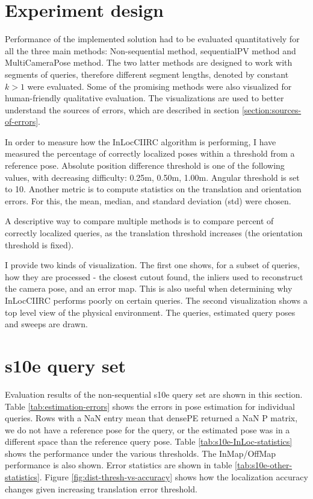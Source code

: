 \documentclass[twoside]{ctuthesis}
\theoremstyle{plain}
\theoremstyle{definition}
\theoremstyle{note}
\begin{document}
\section{Experiment design}
Performance of the implemented solution had to be evaluated quantitatively for all the three main methods: Non-sequential method, sequentialPV method and MultiCameraPose method. The two latter methods are designed to work with segments of queries, therefore different segment lengths, denoted by constant $k>1$ were evaluated. Some of the promising methods were also visualized for human-friendly qualitative evaluation. The visualizations are used to better understand the sources of errors, which are described in section \ref{section:sources-of-errors}.

In order to measure how the InLocCIIRC algorithm is performing, I have measured the percentage of correctly localized poses within a threshold from a reference pose. Absolute position difference threshold is one of the following values, with decreasing difficulty: 0.25m, 0.50m, 1.00m. Angular threshold is set to 10\degree. Another metric is to compute statistics on the translation and orientation errors. For this, the mean, median, and standard deviation (std) were chosen.

A descriptive way to compare multiple methods is to compare percent of correctly localized queries, as the translation threshold increases (the orientation threshold is fixed).

I provide two kinds of visualization. The first one shows, for a subset of queries, how they are processed - the closest cutout found, the inliers used to reconstruct the camera pose, and an error map. This is also useful when determining why InLocCIIRC performs poorly on certain queries. The second visualization shows a top level view of the physical environment. The queries, estimated query poses and sweeps are drawn.

\section{s10e query set}
Evaluation results of the non-sequential s10e query set are shown in this section. Table \ref{tab:estimation-errors} shows the errors in pose estimation for individual queries. Rows with a NaN entry mean that densePE returned a NaN P matrix, we do not have a reference pose for the query, or the estimated pose was in a different space than the reference query pose. Table \ref{tab:s10e-InLoc-statistics} shows the performance under the various thresholds. The InMap/OffMap performance is also shown. Error statistics are shown in table \ref{tab:s10e-other-statistics}. Figure \ref{fig:dist-thresh-vs-accuracy} shows how the localization accuracy changes given increasing translation error threshold.
\end{document}
